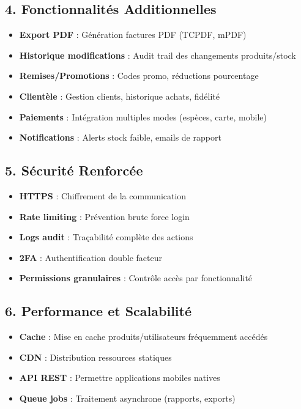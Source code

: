 \documentclass[12pt,a4paper]{report}
\begin{document}
\subsection{4. Fonctionnalités Additionnelles}

\begin{itemize}
    \item \textbf{Export PDF} : Génération factures PDF (TCPDF, mPDF)
    \item \textbf{Historique modifications} : Audit trail des changements produits/stock
    \item \textbf{Remises/Promotions} : Codes promo, réductions pourcentage
    \item \textbf{Clientèle} : Gestion clients, historique achats, fidélité
    \item \textbf{Paiements} : Intégration multiples modes (espèces, carte, mobile)
    \item \textbf{Notifications} : Alerts stock faible, emails de rapport
\end{itemize}

\subsection{5. Sécurité Renforcée}

\begin{itemize}
    \item \textbf{HTTPS} : Chiffrement de la communication
    \item \textbf{Rate limiting} : Prévention brute force login
    \item \textbf{Logs audit} : Traçabilité complète des actions
    \item \textbf{2FA} : Authentification double facteur
    \item \textbf{Permissions granulaires} : Contrôle accès par fonctionnalité
\end{itemize}

\subsection{6. Performance et Scalabilité}

\begin{itemize}
    \item \textbf{Cache} : Mise en cache produits/utilisateurs fréquemment accédés
    \item \textbf{CDN} : Distribution ressources statiques
    \item \textbf{API REST} : Permettre applications mobiles natives
    \item \textbf{Queue jobs} : Traitement asynchrone (rapports, exports)
\end{itemize}
\end{document}
